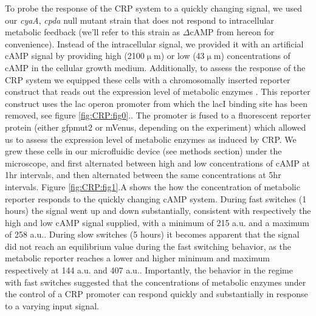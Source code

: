 To probe the response of the CRP system to a quickly changing signal, 
we used
our \textit{cyaA}, \textit{cpda} null mutant strain that does not respond to intracellular metabolic feedback (we'll refer to this strain as $\Delta$cAMP from hereon for convenience).
Instead of the intracellular signal, we provided it with an artificial cAMP signal by providing high (2100$\upmu$m) or low (43$\upmu$m) concentrations of cAMP in the cellular growth medium.
%
Additionally, 
to assess the response of the CRP system we equipped these cells with a chromosomally inserted reporter construct that reads out the expression level of metabolic enzymes \cite{Towbin2017}.
%
%
%
This reporter construct uses the lac operon promoter from which the lacI binding site has been removed, see figure \ref{fig:CRP:fig0}..
The promoter is fused to a fluorescent reporter protein (either gfpmut2 or mVenus, depending on the experiment) which allowed us to
assess
the expression level of metabolic enzymes as induced by CRP.
%
%
%
%
We grew these cells in our microfluidic device (see methods section) under the microscope, and 
first alternated between high and low concentrations of cAMP at 1hr intervals, and then alternated between the same concentrations at 5hr intervals.
%
Figure \ref{fig:CRP:fig1}.A shows the how the concentration of metabolic reporter responds to the quickly changing cAMP system. 
%
During fast switches (1 hours) the signal went up and down substantially, consistent with respectively the high and low cAMP signal supplied, with a minimum of 215 a.u. and a maximum of 258 a.u..
%
During slow switches (5 hours) it becomes apparent that the signal did not reach an equilibrium value during the fast switching behavior, as the metabolic reporter reaches a lower and higher minimum and maximum respectively at 144 a.u. and 407 a.u.. 
%
Importantly, the behavior in the regime with fast switches suggested that the concentrations of metabolic enzymes under the control of a CRP promoter can respond quickly and substantially in response to a varying input signal. 
 


